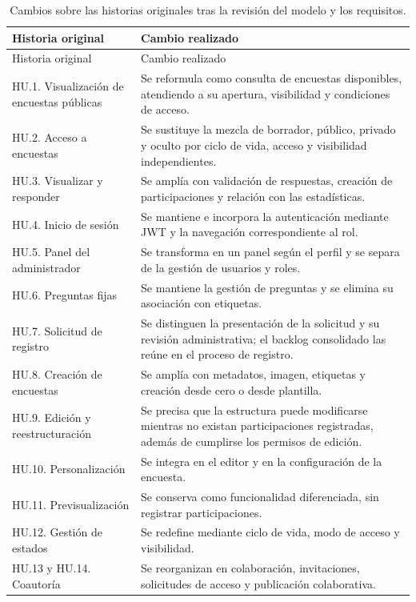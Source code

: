 \documentclass[11pt,a4paper]{report}
\begin{document}
\begin{longtable}{p{}p{}}
\caption{Cambios sobre las historias originales tras la revisión del modelo y los requisitos.}\label{tab:cambios-hu-sprint1}\\
\toprule Historia original & Cambio realizado \\ \midrule
\endfirsthead
\toprule Historia original & Cambio realizado \\ \midrule
\endhead
\bottomrule\endfoot
HU.1. Visualización de encuestas públicas & Se reformula como consulta de encuestas disponibles, atendiendo a su apertura, visibilidad y condiciones de acceso. \\
HU.2. Acceso a encuestas & Se sustituye la mezcla de borrador, público, privado y oculto por ciclo de vida, acceso y visibilidad independientes. \\
HU.3. Visualizar y responder & Se amplía con validación de respuestas, creación de participaciones y relación con las estadísticas. \\
HU.4. Inicio de sesión & Se mantiene e incorpora la autenticación mediante JWT y la navegación correspondiente al rol. \\
HU.5. Panel del administrador & Se transforma en un panel según el perfil y se separa de la gestión de usuarios y roles. \\
HU.6. Preguntas fijas & Se mantiene la gestión de preguntas y se elimina su asociación con etiquetas. \\
HU.7. Solicitud de registro & Se distinguen la presentación de la solicitud y su revisión administrativa; el backlog consolidado las reúne en el proceso de registro. \\
HU.8. Creación de encuestas & Se amplía con metadatos, imagen, etiquetas y creación desde cero o desde plantilla. \\
HU.9. Edición y reestructuración & Se precisa que la estructura puede modificarse mientras no existan participaciones registradas, además de cumplirse los permisos de edición. \\
HU.10. Personalización & Se integra en el editor y en la configuración de la encuesta. \\
HU.11. Previsualización & Se conserva como funcionalidad diferenciada, sin registrar participaciones. \\
HU.12. Gestión de estados & Se redefine mediante ciclo de vida, modo de acceso y visibilidad. \\
HU.13 y HU.14. Coautoría & Se reorganizan en colaboración, invitaciones, solicitudes de acceso y publicación colaborativa. \\

\end{longtable}
\end{document}

